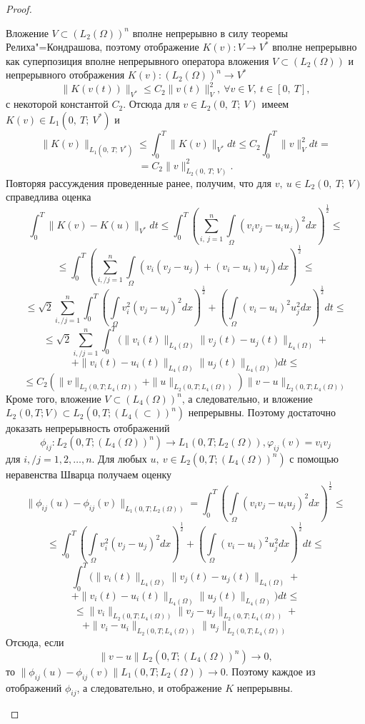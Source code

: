 \begin{proof}
\begin{enumerate}
        Вложение $V\subset (L_2(\Omega))^n$ вполне непрерывно в силу теоремы Релиха"=Кондрашова, поэтому отображение $K(v):V\rightarrow V^*$
        вполне непрерывно как суперпозиция вполне непрерывного оператора вложения $V\subset (L_2(\Omega))$ и непрерывного отображения
        $K(v):(L_2(\Omega))^n\rightarrow V^*$
        $$\| K(v(t)) \|_{V^\ast} \le C_2 \| v(t) \|^2_V, \ \forall v \in V, \ t \in [0, \ T],$$
        с некоторой константой $C_2$.
        Отсюда для $v \in L_2(0, \ T; \ V)$ имеем $K(v) \in L_1(0, \ T; \ V^\ast)$ и
        $$\| K(v)\|_{L_1(0, \ T; \ V^*)}\le\int_0^T\| K(v)\|_{V^*}dt\le C_2\int_0^T\| v\|_V^2dt=$$
        $$=C_2\| v\|_{L_2(0, \ T; \ V)}^2.$$
        Повторяя рассуждения проведенные ранее, получим, что для $v, \ u \in L_2(0, \ T; \ V)$ справедлива оценка
        $$\int_0^T \| K(v)-K(u)\|_{V^*}dt\le\int_0^T (\sum_{i, \ j=1}^n\int\limits_\Omega (v_iv_j-u_iu_j)^2dx)^\frac{1}{2}\le$$
        $$\le\int_0^T(\sum_{i, / j=1}^n\int\limits_\Omega (v_i(v_j-u_j)+(v_i-u_i)u_j)dx)^\frac{1}{2}\le$$
        $$\le\sqrt{2}\sum_{i, / j=1}^n\int_0^T(\int\limits_\Omega v_i^2(v_j-u_j)^2dx)^\frac{1}{2}+(\int\limits_\Omega(v_i-u_i)^2u_j^2dx)^\frac{1}{2}dt\le$$
        $$\le\sqrt{2}\sum_{i, / j=1}^n\int_0^T(\| v_i(t)\|_{L_4(\Omega)}\| v_j(t)-u_j(t)\|_{L_4(\Omega)}+$$
        $$+\| v_i(t)-u_i(t)\|_{L_4(\Omega)}\| u_j(t)\|_{L_4(\Omega)})dt\le$$
        $$\le C_2(\| v \|_{L_2(0, T; L_4(\Omega))}+
        \| u \|_{L_2(0, T; L_4(\Omega))})\| v-u\|_{L_2(0, T; L_4(\Omega))}$$
        Кроме того, вложение $V \subset (L_4(\Omega))^n$, а следовательно, и вложение $L_2(0, T; V) \subset L_2(0, T; (L_4(\subset))^n)$
        непрерывны. Поэтому достаточно доказать непрерывность отображений
        $$\phi_{ij}: L_2(0, T; (L_4(\Omega))^n) \rightarrow L_1(0, T; L_2(\Omega)), \varphi_{ij}(v) = v_i v_j$$
        для $i, / j = 1, 2, \dots, n$.
        Для любых $u, \ v \in L_2(0, T; (L_4(\Omega))^n)$ с помощью неравенства Шварца получаем оценку
        $$\|\phi_{ij}(u)-\phi_{ij}(v)\|_{L_1(0, T; L_2(\Omega))}=\int_0^T(\int\limits_\Omega(v_iv_j-u_iu_j)^2dx)^\frac{1}{2}\le$$
        $$\le\int_0^T(\int\limits_\Omega v_i^2(v_j-u_j)^2dx)^\frac{1}{2}+(\int\limits_\Omega (v_i-u_i)^2u_j^2dx)^\frac{1}{2}dt\le$$
        $$\int_0^T(\| v_i(t)\|_{L_4(\Omega)}\| v_j(t)-u_j(t)\|_{L_4(\Omega)}+$$
        $$+\| v_i(t)-u_i(t)\|_{L_4(\Omega)}\| u_j(t)\|_{L_4(\Omega)})dt\le$$
        $$\le\| v_i\|_{L_2(0, T; L_4(\Omega))}\| v_j-u_j\|_{L_2(0, T; L_4(\Omega))}+$$
        $$+\| v_i-u_i\|_{L_2(0, T; L_4(\Omega))}\| u_j\|_{L_2(0, T; L_4(\Omega))}$$
        Отсюда, если
        $$\| v - u \| L_2(0, T; (L_4(\Omega))^n) \rightarrow 0,$$
        то $\| \phi_{ij}(u) - \phi_{ij}(v) \| L_1(0, T; L_2(\Omega)) \rightarrow 0$.
        Поэтому каждое из отображений $\phi_{ij}$, а следовательно, и отображение $K$ непрерывны.
    \end{enumerate}
\end{proof}

